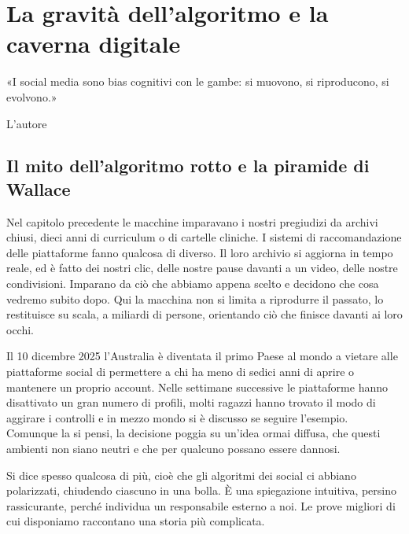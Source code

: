 \chapter{La gravità dell'algoritmo e la caverna digitale}
\label{cap:p2c11}

\epigraph{«I social media sono bias cognitivi con le gambe: si muovono, si riproducono, si evolvono.»}{L'autore}

\section{Il mito dell'algoritmo rotto e la piramide di Wallace}

Nel capitolo precedente le macchine imparavano i nostri pregiudizi da archivi chiusi, dieci anni di curriculum o di cartelle cliniche. I sistemi di raccomandazione delle piattaforme fanno qualcosa di diverso. Il loro archivio si aggiorna in tempo reale, ed è fatto dei nostri clic, delle nostre pause davanti a un video, delle nostre condivisioni. Imparano da ciò che abbiamo appena scelto e decidono che cosa vedremo subito dopo. Qui la macchina non si limita a riprodurre il passato, lo restituisce su scala, a miliardi di persone, orientando ciò che finisce davanti ai loro occhi.

Il 10 dicembre 2025 l'Australia è diventata il primo Paese al mondo a vietare alle piattaforme social di permettere a chi ha meno di sedici anni di aprire o mantenere un proprio account. Nelle settimane successive le piattaforme hanno disattivato un gran numero di profili, molti ragazzi hanno trovato il modo di aggirare i controlli e in mezzo mondo si è discusso se seguire l'esempio. Comunque la si pensi, la decisione poggia su un'idea ormai diffusa, che questi ambienti non siano neutri e che per qualcuno possano essere dannosi.

Si dice spesso qualcosa di più, cioè che gli algoritmi dei social ci abbiano polarizzati, chiudendo ciascuno in una bolla. È una spiegazione intuitiva, persino rassicurante, perché individua un responsabile esterno a noi. Le prove migliori di cui disponiamo raccontano una storia più complicata.

